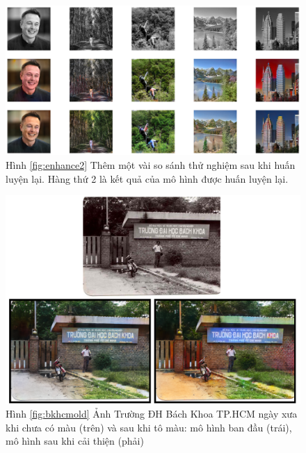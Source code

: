 \documentclass[a4paper, 12pt]{article}
\begin{document}
\begin{figure}[!h]
\captionsetup{width=0.8\textwidth}
\centering
\includegraphics[width=15cm]{images/enhance2.png}
\caption*{Hình \ref{fig:enhance2} Thêm một vài so sánh thử nghiệm sau khi huấn luyện lại. Hàng thứ 2 là kết quả của mô hình được huấn luyện lại.}
\end{figure}

\begin{figure}[!h]
\captionsetup{width=0.85\textwidth}
\centering
\includegraphics[width=15cm]{images/final.PNG}
\caption*{Hình \ref{fig:bkhcmold} Ảnh Trường ĐH Bách Khoa TP.HCM ngày xưa khi chưa có màu (trên) và sau khi tô màu: mô hình ban đầu (trái), mô hình sau khi cải thiện (phải)}
\end{figure}

\clearpage

\renewcommand{\refname}{Tài liệu tham khảo}

\printbibliography
\end{document}
